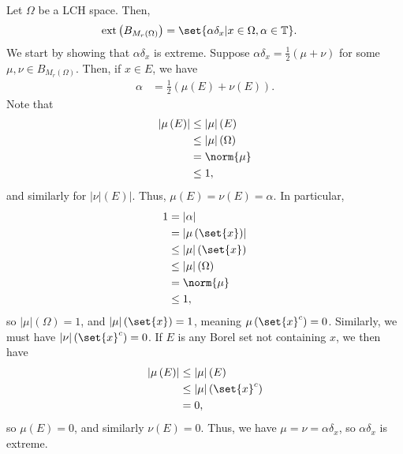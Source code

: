 \documentclass[10pt]{mypackage}
\begin{document}
\begin{example}
  Let $\Omega$ be a LCH space. Then,
  \begin{align*}
    \operatorname{ext}\left( B_{M_r\left( \Omega \right)} \right) &= \set{\alpha\delta_x | x\in\Omega,\alpha\in \mathbb{T}}.
  \end{align*}
  We start by showing that $\alpha\delta_x$ is extreme. Suppose $\alpha\delta_x = \frac{1}{2}\left( \mu + \nu \right)$ for some $\mu,\nu\in B_{M_r\left( \Omega \right)}$. Then, if $x\in E$, we have
  \begin{align*}
    \alpha &= \frac{1}{2}\left( \mu\left( E \right) + \nu\left( E \right) \right).
  \end{align*}
  Note that
  \begin{align*}
    \left\vert \mu\left( E \right) \right\vert &\leq \left\vert \mu \right\vert\left( E \right)\\
                                               &\leq \left\vert \mu \right\vert\left( \Omega \right)\\
                                               &= \norm{\mu}\\
                                               &\leq 1,
  \end{align*}
  and similarly for $\left\vert \nu\vert\left( E \right) \right\vert$. Thus, $\mu\left( E \right) =\nu\left( E \right) = \alpha$. In particular,
  \begin{align*}
    1 &= \left\vert \alpha \right\vert\\
      &= \left\vert \mu\left( \set{x} \right) \right\vert\\
      &\leq \left\vert \mu \right\vert\left( \set{x} \right)\\
      &\leq \left\vert \mu \right\vert\left( \Omega \right)\\
      &= \norm{\mu}\\
      &\leq 1,
  \end{align*}
  so $\left\vert \mu \right\vert\left( \Omega \right) = 1$, and $\left\vert \mu \right\vert\left( \set{x} \right) = 1$, meaning $\mu\left( \set{x}^{c} \right) = 0$. Similarly, we must have $\left\vert \nu \right\vert\left( \set{x}^{c} \right) = 0$. If $E$ is any Borel set not containing $x$, we then have
  \begin{align*}
    \left\vert \mu\left( E \right) \right\vert &\leq \left\vert \mu \right\vert\left( E \right)\\
                                               &\leq \left\vert \mu \right\vert\left( \set{x}^{c} \right)\\
                                               &= 0,
  \end{align*}
  so $\mu\left( E \right) = 0$, and similarly $\nu\left( E \right) = 0$. Thus, we have $\mu=\nu=\alpha\delta_x$, so $\alpha\delta_x$ is extreme.\newline


\end{example}
\end{document}
